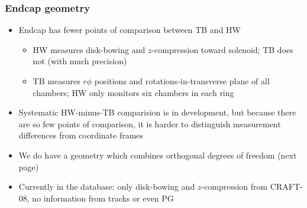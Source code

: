 \documentclass[compress]{beamer}
\begin{document}
\begin{frame}
\frametitle{Endcap geometry}
\begin{itemize}\setlength{\itemsep}{0.25 cm}
\item Endcap has fewer points of comparison between TB and HW
\begin{itemize}
\item HW measures disk-bowing and $z$-compression toward solenoid; TB does not (with much precision)
\item TB measures $r\phi$ positions and rotations-in-transverse plane of all chambers; HW only monitors six chambers in each ring
\end{itemize}
\item Systematic HW-minus-TB comparision is in development, but
  because there are so few points of comparison, it is harder to
  distinguish measurement differences from coordinate frames

\item We do have a geometry which combines orthogonal degrees of
  freedom (next page)

\vspace{0.5 cm}
\item Currently in the database: only disk-bowing and $z$-compression
  from CRAFT-08, no information from tracks or even PG
\end{itemize}
\end{frame}
\end{document}
